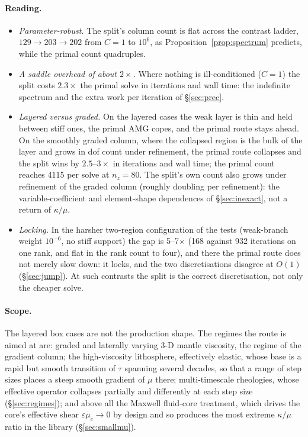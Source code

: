 \documentclass[11pt]{article}
\numberwithin{equation}{section}
\theoremstyle{remark}
\newcommand{\eps}{\varepsilon}
\begin{document}
\paragraph{Reading.}
\begin{itemize}
\item \emph{Parameter-robust.} The split's column count is flat across
  the contrast ladder, $129\to203\to202$ from $C = 1$ to $10^6$, as
  Proposition~\ref{prop:spectrum} predicts, while the primal count
  quadruples.
\item \emph{A saddle overhead of about $2\times$.} Where nothing is
  ill-conditioned ($C = 1$) the split costs $2.3\times$ the primal solve in
  iterations and wall time: the indefinite spectrum and the extra work per
  iteration of \S\ref{sec:prec}.
\item \emph{Layered versus graded.} On the layered cases the weak layer is
  thin and held between stiff ones, the primal AMG copes, and the primal
  route stays ahead. On the smoothly graded column, where the collapsed
  region is the bulk of the layer and grows in dof count under refinement,
  the primal route collapses and the split wins by $2.5$--$3\times$ in
  iterations and wall time; the primal count reaches 4115 per solve at
  $n_z = 80$. The split's own count also grows under refinement of the
  graded column (roughly doubling per refinement): the variable-coefficient
  and element-shape dependences of \S\ref{sec:inexact}, not a return of
  $\kappa/\mu$.
\item \emph{Locking.} In the harsher two-region configuration of the
  tests (weak-branch weight $10^{-6}$, no stiff support) the gap is
  5--7$\times$ (168 against 932 iterations on one rank, and flat in the
  rank count to four), and there the primal route does not merely slow
  down: it locks, and the two discretisations disagree at $O(1)$
  (\S\ref{sec:jump}). At such contrasts the split is the correct
  discretisation, not only the cheaper solve.
\end{itemize}

\paragraph{Scope.} The layered box cases are not the production shape.
The regimes the route is aimed at are: graded and laterally varying 3-D
mantle viscosity, the regime of the gradient column; the high-viscosity
lithosphere, effectively elastic, whose base is a rapid but smooth
transition of $\tau$ spanning several decades, so that a range of step
sizes places a steep smooth gradient of $\mu$ there; multi-timescale
rheologies, whose effective operator collapses partially and differently
at each step size (\S\ref{sec:regimes}); and above all the Maxwell
fluid-core treatment, which drives the core's effective shear
$\eps\mu_c\to0$ by design and so produces the most extreme $\kappa/\mu$
ratio in the library (\S\ref{sec:smallmu}).
\end{document}

